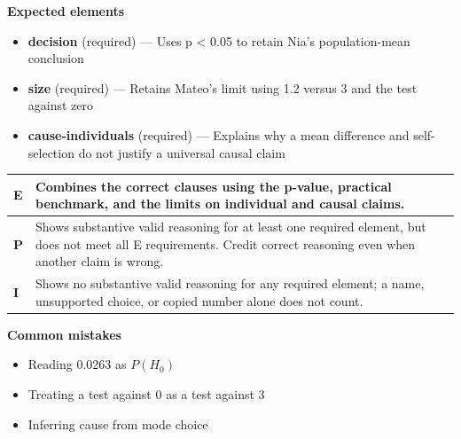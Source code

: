 \documentclass[11pt]{article}
\begin{document}

\textbf{Expected elements}
\begin{itemize}[leftmargin=1.5em,itemsep=2pt,topsep=2pt]
  \item \textbf{decision} (required) --- Uses p < 0.05 to retain Nia's population-mean conclusion
  \item \textbf{size} (required) --- Retains Mateo's limit using 1.2 versus 3 and the test against zero
  \item \textbf{cause-individuals} (required) --- Explains why a mean difference and self-selection do not justify a universal causal claim
\end{itemize}

{\small\renewcommand{\arraystretch}{1.25}
\noindent\begin{tabular}{|p{0.5in}|p{5.9in}|}
\hline
\textbf{E} & Combines the correct clauses using the p-value, practical benchmark, and the limits on individual and causal claims. \\ \hline
\textbf{P} & Shows substantive valid reasoning for at least one required element, but does not meet all E requirements. Credit correct reasoning even when another claim is wrong. \\ \hline
\textbf{I} & Shows no substantive valid reasoning for any required element; a name, unsupported choice, or copied number alone does not count. \\ \hline
\end{tabular}}

\textbf{Common mistakes}
\begin{itemize}[leftmargin=1.5em,itemsep=2pt,topsep=2pt]
  \item Reading 0.0263 as $P(H_0)$
  \item Treating a test against 0 as a test against 3
  \item Inferring cause from mode choice
\end{itemize}

\clearpage
{}
\end{document}
